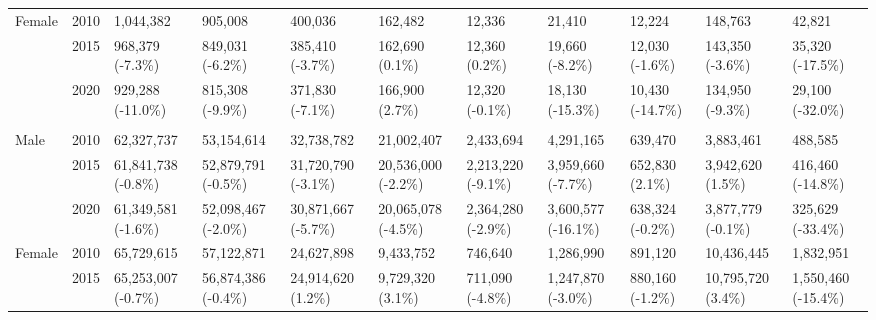 \documentclass[serif, aspectratio=169]{beamer}
\begin{document}
\begin{frame}[label=workers_number]
\begin{table}[htbp]
{\begin{tabular}{lllllllllll}
\addlinespace[0.3em]
Female & 2010 & 1,044,382 & 905,008 & \multicolumn{1}{l}{400,036} & \multicolumn{1}{l}{162,482} & \multicolumn{1}{l}{12,336} & \multicolumn{1}{l}{21,410} & \multicolumn{1}{l}{12,224} & \multicolumn{1}{l}{148,763} & \multicolumn{1}{l}{42,821} \\
 & 2015 & 968,379 (-7.3\%) & 849,031 (-6.2\%) & \multicolumn{1}{l}{385,410 (-3.7\%)} & \multicolumn{1}{l}{162,690 (0.1\%)} & \multicolumn{1}{l}{12,360 (0.2\%)} & \multicolumn{1}{l}{19,660 (-8.2\%)} & \multicolumn{1}{l}{12,030 (-1.6\%)} & \multicolumn{1}{l}{143,350 (-3.6\%)} & \multicolumn{1}{l}{35,320 (-17.5\%)} \\
 & 2020 & 929,288 (-11.0\%) & 815,308 (-9.9\%) & \multicolumn{1}{l}{371,830 (-7.1\%)} & \multicolumn{1}{l}{166,900 (2.7\%)} & \multicolumn{1}{l}{12,320 (-0.1\%)} & \multicolumn{1}{l}{18,130 (-15.3\%)} & \multicolumn{1}{l}{10,430 (-14.7\%)} & \multicolumn{1}{l}{134,950 (-9.3\%)} & \multicolumn{1}{l}{29,100 (-32.0\%)} \\
\hline
\addlinespace[0.5em]
\multicolumn{11}{l}{\textbf{Nationwide}} \\
\addlinespace[0.5em]
Male & 2010 & 62,327,737 & 53,154,614 & \multicolumn{1}{l}{32,738,782} & \multicolumn{1}{l}{21,002,407} & \multicolumn{1}{l}{2,433,694} & \multicolumn{1}{l}{4,291,165} & \multicolumn{1}{l}{639,470} & \multicolumn{1}{l}{3,883,461} & \multicolumn{1}{l}{488,585} \\
 & 2015 & 61,841,738 (-0.8\%) & 52,879,791 (-0.5\%) & \multicolumn{1}{l}{31,720,790 (-3.1\%)} & \multicolumn{1}{l}{20,536,000 (-2.2\%)} & \multicolumn{1}{l}{2,213,220 (-9.1\%)} & \multicolumn{1}{l}{3,959,660 (-7.7\%)} & \multicolumn{1}{l}{652,830 (2.1\%)} & \multicolumn{1}{l}{3,942,620 (1.5\%)} & \multicolumn{1}{l}{416,460 (-14.8\%)} \\
 & 2020 & 61,349,581 (-1.6\%) & 52,098,467 (-2.0\%) & \multicolumn{1}{l}{30,871,667 (-5.7\%)} & \multicolumn{1}{l}{20,065,078 (-4.5\%)} & \multicolumn{1}{l}{2,364,280 (-2.9\%)} & \multicolumn{1}{l}{3,600,577 (-16.1\%)} & \multicolumn{1}{l}{638,324 (-0.2\%)} & \multicolumn{1}{l}{3,877,779 (-0.1\%)} & \multicolumn{1}{l}{325,629 (-33.4\%)} \\
\addlinespace[0.3em]
Female & 2010 & 65,729,615 & 57,122,871 & \multicolumn{1}{l}{24,627,898} & \multicolumn{1}{l}{9,433,752} & \multicolumn{1}{l}{746,640} & \multicolumn{1}{l}{1,286,990} & \multicolumn{1}{l}{891,120} & \multicolumn{1}{l}{10,436,445} & \multicolumn{1}{l}{1,832,951} \\
 & 2015 & 65,253,007 (-0.7\%) & 56,874,386 (-0.4\%) & \multicolumn{1}{l}{24,914,620 (1.2\%)} & \multicolumn{1}{l}{9,729,320 (3.1\%)} & \multicolumn{1}{l}{711,090 (-4.8\%)} & \multicolumn{1}{l}{1,247,870 (-3.0\%)} & \multicolumn{1}{l}{880,160 (-1.2\%)} & \multicolumn{1}{l}{10,795,720 (3.4\%)} & \multicolumn{1}{l}{1,550,460 (-15.4\%)} \\

\end{tabular}}
\end{table}
\end{frame}
\end{document}
